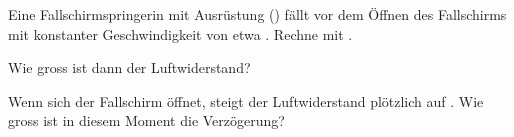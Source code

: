 Eine Fallschirmspringerin mit Ausrüstung (\mO) fällt vor dem Öffnen des Fallschirms mit konstanter Geschwindigkeit von etwa \vFO. Rechne mit \gO.

\begin{abcliste}
\abc
Wie gross ist dann der Luftwiderstand?

\abc
Wenn sich der Fallschirm öffnet, steigt der Luftwiderstand plötzlich auf \FLbO. Wie gross ist in diesem Moment die Verzögerung?
\end{abcliste}
